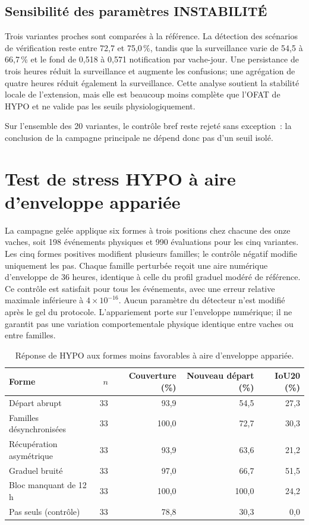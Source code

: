 \subsection{Sensibilité des paramètres INSTABILITÉ}
Trois variantes proches sont comparées à la référence. La détection des scénarios de vérification reste entre
72,7 et 75,0\,\%, tandis que la surveillance varie de 54,5 à 66,7\,\% et le fond de 0,518 à
0,571 notification par vache-jour. Une persistance de trois heures réduit la surveillance
et augmente les confusions; une agrégation de quatre heures réduit également la surveillance.
Cette analyse soutient la stabilité locale de l'extension, mais elle est beaucoup moins
complète que l'OFAT de HYPO et ne valide pas les seuils physiologiquement.

Sur l'ensemble des 20 variantes, le contrôle bref reste rejeté sans exception~: la conclusion
de la campagne principale ne dépend donc pas d'un seuil isolé.

\section{Test de stress HYPO à aire d'enveloppe appariée}
La campagne gelée applique six formes à trois positions chez chacune des onze vaches, soit
198 événements physiques et 990 évaluations pour les cinq variantes. Les cinq formes
positives modifient plusieurs familles; le contrôle négatif modifie uniquement les pas.
Chaque famille perturbée reçoit une aire numérique d'enveloppe de 36 heures, identique à celle du
profil graduel modéré de référence. Ce contrôle est satisfait pour tous les événements, avec
une erreur relative maximale inférieure à $4\times10^{-16}$. Aucun paramètre du détecteur
n'est modifié après le gel du protocole. L'appariement porte sur l'enveloppe numérique; il ne
garantit pas une variation comportementale physique identique entre vaches ou entre familles.

\begin{table}[H]
  \centering
  \caption{Réponse de HYPO aux formes moins favorables à aire d'enveloppe appariée.}
  \label{tab:hypo_stress}
  \small
  \begin{tabular}{lrrrr}
    \toprule
    Forme & $n$ & Couverture (\%) & Nouveau départ (\%) & IoU20 (\%) \\
    \midrule
    Départ abrupt & 33 & 93,9 & 54,5 & 27,3 \\
    Familles désynchronisées & 33 & 100,0 & 72,7 & 30,3 \\
    Récupération asymétrique & 33 & 93,9 & 63,6 & 21,2 \\
    Graduel bruité & 33 & 97,0 & 66,7 & 51,5 \\
    Bloc manquant de 12 h & 33 & 100,0 & 100,0 & 24,2 \\
    Pas seuls (contrôle) & 33 & 78,8 & 30,3 & 0,0 \\
    \bottomrule
  \end{tabular}
\end{table}

